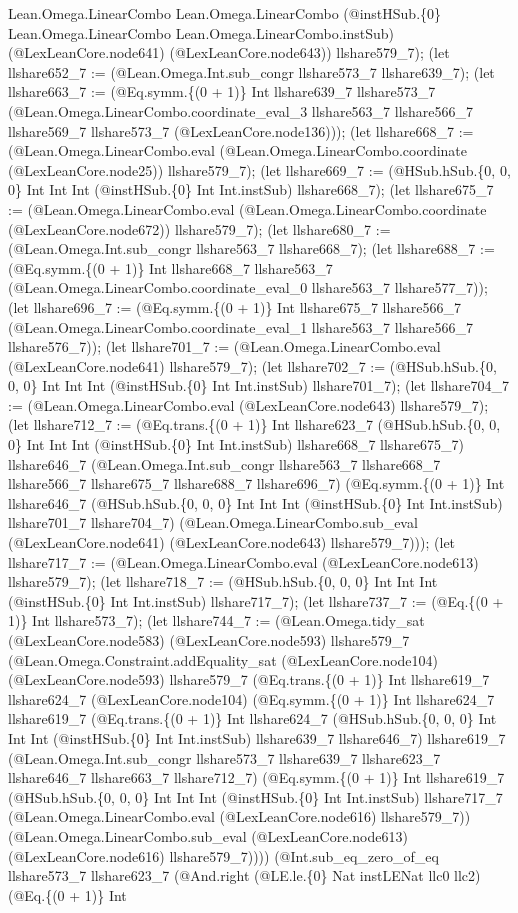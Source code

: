 \documentclass[11pt]{article}
\begin{document}
Lean.Omega.LinearCombo Lean.Omega.LinearCombo (@instHSub.\{0\} Lean.Omega.LinearCombo Lean.Omega.LinearCombo.instSub) (@LexLeanCore.node641) (@LexLeanCore.node643)) llshare579\_7); (let llshare652\_7 := (@Lean.Omega.Int.sub\_congr llshare573\_7 llshare639\_7); (let llshare663\_7 := (@Eq.symm.\{(0 + 1)\} Int llshare639\_7 llshare573\_7 (@Lean.Omega.LinearCombo.coordinate\_eval\_3 llshare563\_7 llshare566\_7 llshare569\_7 llshare573\_7 (@LexLeanCore.node136))); (let llshare668\_7 := (@Lean.Omega.LinearCombo.eval (@Lean.Omega.LinearCombo.coordinate (@LexLeanCore.node25)) llshare579\_7); (let llshare669\_7 := (@HSub.hSub.\{0, 0, 0\} Int Int Int (@instHSub.\{0\} Int Int.instSub) llshare668\_7); (let llshare675\_7 := (@Lean.Omega.LinearCombo.eval (@Lean.Omega.LinearCombo.coordinate (@LexLeanCore.node672)) llshare579\_7); (let llshare680\_7 := (@Lean.Omega.Int.sub\_congr llshare563\_7 llshare668\_7); (let llshare688\_7 := (@Eq.symm.\{(0 + 1)\} Int llshare668\_7 llshare563\_7 (@Lean.Omega.LinearCombo.coordinate\_eval\_0 llshare563\_7 llshare577\_7)); (let llshare696\_7 := (@Eq.symm.\{(0 + 1)\} Int llshare675\_7 llshare566\_7 (@Lean.Omega.LinearCombo.coordinate\_eval\_1 llshare563\_7 llshare566\_7 llshare576\_7)); (let llshare701\_7 := (@Lean.Omega.LinearCombo.eval (@LexLeanCore.node641) llshare579\_7); (let llshare702\_7 := (@HSub.hSub.\{0, 0, 0\} Int Int Int (@instHSub.\{0\} Int Int.instSub) llshare701\_7); (let llshare704\_7 := (@Lean.Omega.LinearCombo.eval (@LexLeanCore.node643) llshare579\_7); (let llshare712\_7 := (@Eq.trans.\{(0 + 1)\} Int llshare623\_7 (@HSub.hSub.\{0, 0, 0\} Int Int Int (@instHSub.\{0\} Int Int.instSub) llshare668\_7 llshare675\_7) llshare646\_7 (@Lean.Omega.Int.sub\_congr llshare563\_7 llshare668\_7 llshare566\_7 llshare675\_7 llshare688\_7 llshare696\_7) (@Eq.symm.\{(0 + 1)\} Int llshare646\_7 (@HSub.hSub.\{0, 0, 0\} Int Int Int (@instHSub.\{0\} Int Int.instSub) llshare701\_7 llshare704\_7) (@Lean.Omega.LinearCombo.sub\_eval (@LexLeanCore.node641) (@LexLeanCore.node643) llshare579\_7))); (let llshare717\_7 := (@Lean.Omega.LinearCombo.eval (@LexLeanCore.node613) llshare579\_7); (let llshare718\_7 := (@HSub.hSub.\{0, 0, 0\} Int Int Int (@instHSub.\{0\} Int Int.instSub) llshare717\_7); (let llshare737\_7 := (@Eq.\{(0 + 1)\} Int llshare573\_7); (let llshare744\_7 := (@Lean.Omega.tidy\_sat (@LexLeanCore.node583) (@LexLeanCore.node593) llshare579\_7 (@Lean.Omega.Constraint.addEquality\_sat (@LexLeanCore.node104) (@LexLeanCore.node593) llshare579\_7 (@Eq.trans.\{(0 + 1)\} Int llshare619\_7 llshare624\_7 (@LexLeanCore.node104) (@Eq.symm.\{(0 + 1)\} Int llshare624\_7 llshare619\_7 (@Eq.trans.\{(0 + 1)\} Int llshare624\_7 (@HSub.hSub.\{0, 0, 0\} Int Int Int (@instHSub.\{0\} Int Int.instSub) llshare639\_7 llshare646\_7) llshare619\_7 (@Lean.Omega.Int.sub\_congr llshare573\_7 llshare639\_7 llshare623\_7 llshare646\_7 llshare663\_7 llshare712\_7) (@Eq.symm.\{(0 + 1)\} Int llshare619\_7 (@HSub.hSub.\{0, 0, 0\} Int Int Int (@instHSub.\{0\} Int Int.instSub) llshare717\_7 (@Lean.Omega.LinearCombo.eval (@LexLeanCore.node616) llshare579\_7)) (@Lean.Omega.LinearCombo.sub\_eval (@LexLeanCore.node613) (@LexLeanCore.node616) llshare579\_7)))) (@Int.sub\_eq\_zero\_of\_eq llshare573\_7 llshare623\_7 (@And.right (@LE.le.\{0\} Nat instLENat llc0 llc2) (@Eq.\{(0 + 1)\} Int 
\end{document}
